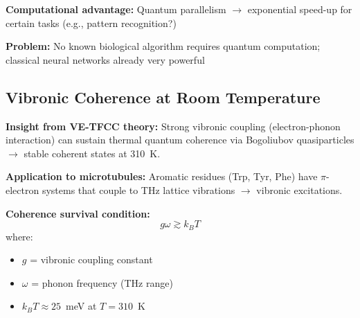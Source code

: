 \begin{center}
\end{center}

\textbf{Computational advantage:} Quantum parallelism $\rightarrow$ exponential speed-up for certain tasks (e.g., pattern recognition?)

\textbf{Problem:} No known biological algorithm requires quantum computation; classical neural networks already very powerful

\subsection{Vibronic Coherence at Room Temperature}

\textbf{Insight from VE-TFCC theory:} Strong vibronic coupling (electron-phonon interaction) can sustain thermal quantum coherence via Bogoliubov quasiparticles $\rightarrow$ stable coherent states at 310~K.

\textbf{Application to microtubules:} Aromatic residues (Trp, Tyr, Phe) have $\pi$-electron systems that couple to THz lattice vibrations $\rightarrow$ vibronic excitations.

\textbf{Coherence survival condition:}
\begin{equation}
g \omega \gtrsim k_B T
\end{equation}
where:
\begin{itemize}
\item $g$ = vibronic coupling constant
\item $\omega$ = phonon frequency (THz range)
\item $k_B T \approx 25$~meV at $T = 310$~K
\end{itemize}

